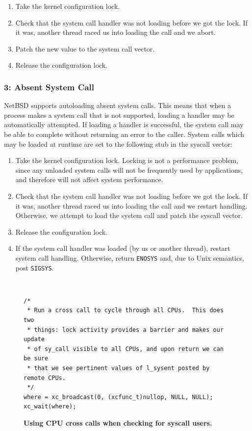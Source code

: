 \begin{enumerate}
\item	Take the kernel configuration lock.
\item   Check that the system call handler was not loading before
	we got the lock.  If it was, another thread raced us into loading
	the call and we abort.
\item	Patch the new value to the system call vector.
\item   Release the configuration lock.
\end{enumerate}

\subsubsection*{3: Absent System Call}

NetBSD supports autoloading absent system calls.  This means that when
a process makes a system call that is not supported, loading a handler
may be automatically attempted.  If loading a handler is successful,
the system call may be able to complete without returning an error to
the caller.  System calls which may be loaded at runtime are set to the
following stub in the syscall vector:

\begin{enumerate}
\item	Take the kernel configuration lock.  Locking is not a performance
	problem, since any unloaded system calls will not be frequently
	used by applications, and therefore will not affect system
	performance.
\item   Check that the system call handler was not loading before
	we got the lock.  If it was, another thread raced us into loading
	the call and we restart handling.  Otherwise, we attempt to load
	the system call and patch the syscall vector.
\item	Release the configuration lock.
\item	If the system call handler was loaded (by us or another thread),
	restart system
	call handling.  Otherwise, return \texttt{ENOSYS} and, due to
	Unix semantics, post \texttt{SIGSYS}.
\end{enumerate}

\begin{figure}[t]
{\tt \scriptsize 
\begin{verbatim}
/*
 * Run a cross call to cycle through all CPUs.  This does two
 * things: lock activity provides a barrier and makes our update
 * of sy_call visible to all CPUs, and upon return we can be sure
 * that we see pertinent values of l_sysent posted by remote CPUs.
 */
where = xc_broadcast(0, (xcfunc_t)nullop, NULL, NULL);
xc_wait(where);
\end{verbatim}}
\caption[Using CPU cross calls when checking for syscall users]{
\textbf{Using CPU cross calls when checking for syscall users.}}
\label{fig:sysxcall}
\end{figure}

